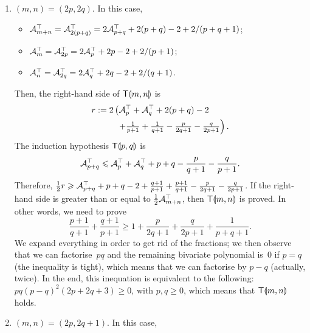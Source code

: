 \begin{enumerate}

  \item \((m,n) = (2p,2q)\). In this case,
    \begin{itemize}

      \item \(\mathcal{A}_{m+n}^{\top} = \mathcal{A}_{2(p+q)}^{\top} =
        2\mathcal{A}_{p+q}^{\top} + 2(p+q) - 2 + 2/(p+q+1)\);

      \item \(\mathcal{A}_{m}^{\top} = \mathcal{A}_{2p}^{\top} =
        2\mathcal{A}_{p}^{\top} + 2p - 2 + 2/(p+1)\);

      \item \(\mathcal{A}_{n}^{\top} = \mathcal{A}_{2q}^{\top} = 
        2\mathcal{A}_{q}^{\top} + 2q - 2 + 2/(q+1)\).

    \end{itemize}
    Then, the right-hand side of \(\textsf{T}\llparenthesis{m,n}\rrparenthesis\) is
    \begin{align*}
      r &:= 2\left(\mathcal{A}_{p}^{\top} + \mathcal{A}_{q}^{\top} + 2(p+q) - 2\right.\\
        &\phantom{:= 2(} \; \left.+
        \tfrac{1}{p+1} + \tfrac{1}{q+1} - \tfrac{p}{2q+1} - 
        \tfrac{q}{2p+1}\right).
    \end{align*}
    The induction hypothesis \(\textsf{T}\llparenthesis{p,q}\rrparenthesis\) is
    \begin{equation*}
      \mathcal{A}_{p+q}^{\top} \leqslant \mathcal{A}_{p}^{\top} +
      \mathcal{A}_{q}^{\top} + p + q - \frac{p}{q+1} - \frac{q}{p+1}.
    \end{equation*}
    Therefore, \(\tfrac{1}{2}r \geqslant \mathcal{A}_{p+q}^{\top} + p + q -
    2 + \tfrac{q+1}{p+1} + \tfrac{p+1}{q+1} - \tfrac{p}{2q+1} -
    \tfrac{q}{2p+1}\). If the right-hand side is greater than or
    equal to \(\tfrac{1}{2}\mathcal{A}_{m+n}^{\top}\), then
    \(\textsf{T}\llparenthesis{m,n}\rrparenthesis\) is proved. In other words, we need to prove
    \begin{equation*}
      \frac{p+1}{q+1} + \frac{q+1}{p+1} \geqslant 1 +
      \frac{p}{2q+1} + \frac{q}{2p+1} + \frac{1}{p+q+1}.
    \end{equation*}
    We expand everything in order to get rid of the fractions; we then
    observe that we can factorise~\(pq\) and the remaining bivariate
    polynomial is~\(0\) if \(p=q\) (the inequality is tight), which
    means that we can factorise by \(p-q\) (actually, twice). In the
    end, this inequation is equivalent to the following:
    \(pq(p-q)^2(2p+2q+3) \geqslant 0\), with \(p,q \geqslant 0\),
    which means that \(\textsf{T}\llparenthesis{m,n}\rrparenthesis\) holds.

  \item \((m,n) = (2p,2q+1)\). In this case,
    \begin{itemize}


\end{itemize}
\end{enumerate}
